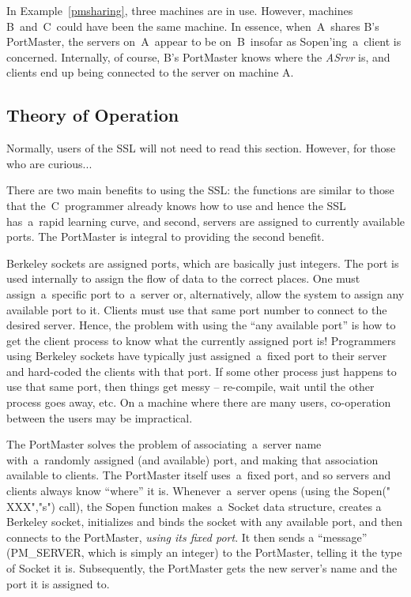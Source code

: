 \documentclass[12pt]{article}
\def\SSL{{\small SSL}}
\begin{document}
In Example~\ref{pmsharing}, three machines are in use.  However, machines
B~and~C~could have been the same machine.  In essence, when~A~shares B's
PortMaster, the servers on~A~appear to be on~B~insofar as Sopen'ing~a~client
is concerned.  Internally, of course, B's PortMaster knows where the {\em ASrvr}
is, and clients end up being connected to the server on machine A.

\subsection{Theory of Operation}

Normally, users of the {\SSL} will not need to read this section.  However,
for those who are curious...

There are two main benefits to using the \SSL: the functions are similar
to those that the~C~programmer already knows how to use and hence the {\SSL} 
has~a~rapid learning curve, and second, servers are assigned to currently
available ports.  The PortMaster is integral to providing the second benefit.

Berkeley sockets are assigned ports, which are basically just integers.  The
port is used internally to assign the flow of data to the correct places.
One must assign~a~specific port to~a~server or, alternatively, allow the
system to assign any available port to it.  Clients must use that same port
number to connect to the desired server.  Hence, the problem with using the
``any available port'' is how to get the client process to know what the
currently assigned port is!  Programmers using Berkeley sockets have typically
just assigned~a~fixed port to their server and hard-coded the clients with that
port.  If some other process just happens to use that same port, then things
get messy -- re-compile, wait until the other process goes away, etc.  On a
machine where there are many users, co-operation between the users may be
impractical.

The PortMaster solves the problem of associating~a~server name with~a~randomly
assigned (and available) port, and making that association available to
clients.  The PortMaster itself uses~a~fixed port, and so servers and clients
always know ``where'' it is.  Whenever~a~server opens (using the Sopen("{\small
XXX}","s") call), the Sopen function makes~a~Socket data structure, creates a
Berkeley socket, initializes and binds the socket with any available port, and
then connects to the PortMaster, {\em using its fixed port}.  It then sends a
``message'' ({\small PM\_SERVER}, which is simply an integer) to the
PortMaster, telling it the type of Socket it is.  Subsequently, the PortMaster
gets the new server's name and the port it is assigned to.
\end{document}
